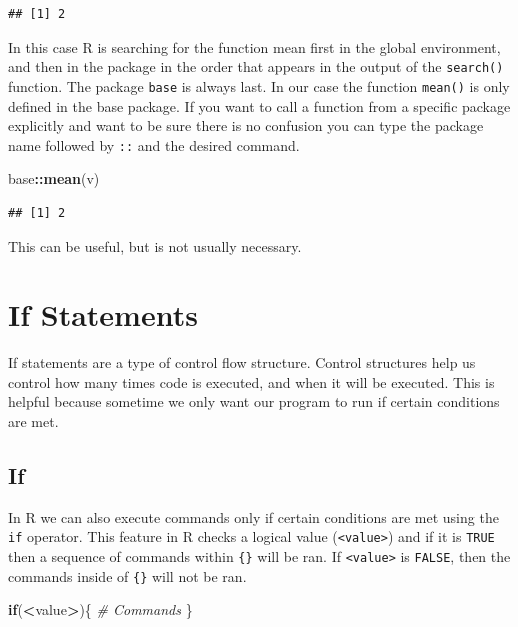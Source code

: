 \documentclass[
]{book}
\newenvironment{Shaded}{\begin{snugshade}}{\end{snugshade}}
\newcommand{\CommentTok}[1]{\textcolor[rgb]{0.56,0.35,0.01}{\textit{#1}}}
\newcommand{\ControlFlowTok}[1]{\textcolor[rgb]{0.13,0.29,0.53}{\textbf{#1}}}
\newcommand{\KeywordTok}[1]{\textcolor[rgb]{0.13,0.29,0.53}{\textbf{#1}}}
\newcommand{\NormalTok}[1]{#1}
\newcommand{\OperatorTok}[1]{\textcolor[rgb]{0.81,0.36,0.00}{\textbf{#1}}}
\begin{document}
\begin{verbatim}
## [1] 2
\end{verbatim}

In this case R is searching for the function mean first in the global environment, and then in the package in the order that appears in the output of the \texttt{search()} function. The package \texttt{base} is always last. In our case the function \texttt{mean()} is only defined in the base package. If you want to call a function from a specific package explicitly and want to be sure there is no confusion you can type the package name followed by \texttt{::} and the desired command.

\begin{Shaded}
\begin{Highlighting}[]
\NormalTok{base}\OperatorTok{::}\KeywordTok{mean}\NormalTok{(v)}
\end{Highlighting}
\end{Shaded}

\begin{verbatim}
## [1] 2
\end{verbatim}

This can be useful, but is not usually necessary.

\hypertarget{if-statements}{%
\chapter{If Statements}\label{if-statements}}

If statements are a type of control flow structure. Control structures help us control how many times code is executed, and when it will be executed. This is helpful because sometime we only want our program to run if certain conditions are met.

\hypertarget{if}{%
\section{If}\label{if}}

In R we can also execute commands only if certain conditions are met using the \texttt{if} operator. This feature in R checks a logical value (\texttt{\textless{}value\textgreater{}}) and if it is \texttt{TRUE} then a sequence of commands within \texttt{\{\}} will be ran. If \texttt{\textless{}value\textgreater{}} is \texttt{FALSE}, then the commands inside of \texttt{\{\}} will not be ran.

\begin{Shaded}
\begin{Highlighting}[]
\ControlFlowTok{if}\NormalTok{(}\OperatorTok{<}\NormalTok{value}\OperatorTok{>}\NormalTok{)\{}
  \CommentTok{# Commands }
\NormalTok{\}}
\end{Highlighting}
\end{Shaded}
\end{document}
